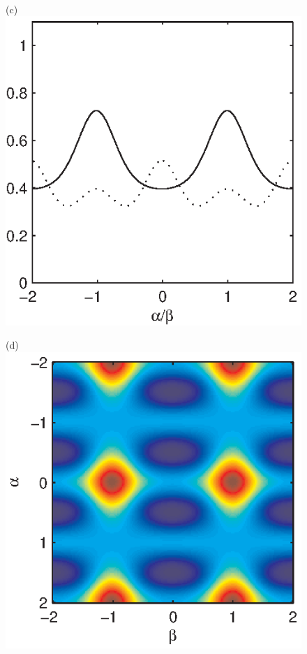 \documentclass[dvips,aoas,preprint]{imsart}
\numberwithin{equation}{section}
\theoremstyle{plain}
\begin{document}
\begin{figure}[!htbp]
\begin{minipage}[]{0.35\textwidth}
    \end{minipage}\\
    \begin{minipage}[]{0.32\textwidth}
      \centering
      (c)
      \includegraphics*[width=\textwidth]{pdfen13b.eps}
    \end{minipage}
    \begin{minipage}[]{0.35\textwidth}
      \centering
      (d)
      \includegraphics*[width=\textwidth]{pdfen13.eps}

\end{minipage}
\end{figure}
\end{document}

